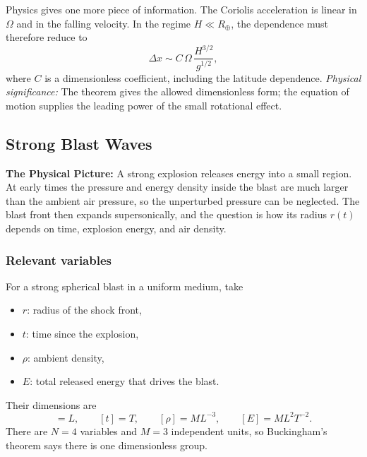 Physics gives one more piece of information. The Coriolis acceleration is
linear in $\Omega$ and in the falling velocity. In the regime $H\ll R_\oplus$,
the dependence must therefore reduce to
\begin{equation}
    \boxed{
    \Delta x \sim C\,\Omega\,\frac{H^{3/2}}{g^{1/2}},
    }
    \label{eq:lec05:coriolis-scaling}
\end{equation}
where $C$ is a dimensionless coefficient, including the latitude dependence.
\textit{Physical significance:} The theorem gives the allowed dimensionless
form; the equation of motion supplies the leading power of the small rotational
effect.

\subsection{Strong Blast Waves}
\label{sec:lec05:blast-waves}

\textbf{The Physical Picture:}
A strong explosion releases energy into a small region. At early times the
pressure and energy density inside the blast are much larger than the ambient
air pressure, so the unperturbed pressure can be neglected. The blast front
then expands supersonically, and the question is how its radius $r(t)$ depends
on time, explosion energy, and air density.

\subsubsection*{Relevant variables}
For a strong spherical blast in a uniform medium, take
\begin{itemize}
    \item $r$: radius of the shock front,
    \item $t$: time since the explosion,
    \item $\rho$: ambient density,
    \item $E$: total released energy that drives the blast.
\end{itemize}
Their dimensions are
\begin{equation*}
    [r]=L,\qquad [t]=T,\qquad [\rho]=ML^{-3},\qquad [E]=ML^2T^{-2}.
\end{equation*}
There are $N=4$ variables and $M=3$ independent units, so Buckingham's theorem
says there is one dimensionless group.

